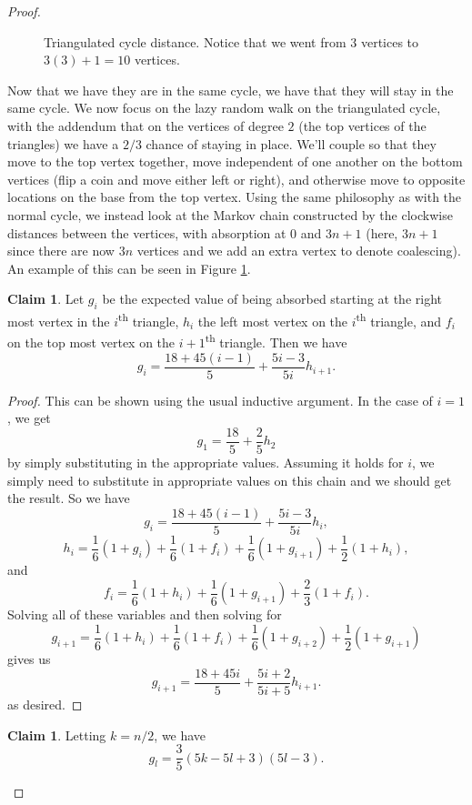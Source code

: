 \documentclass[10pt,a4paper]{amsart}
\theoremstyle{definition}
\numberwithin{definition}{section}
\newtheorem{claim}[definition]{Claim}
\begin{document}
\begin{proof}
\begin{figure}
    \caption{Triangulated cycle distance. Notice that we went from $3$ vertices to $3(3)+1 = 10$ vertices.}
    \label{fig:graph15}
\end{figure}

Now that we have they are in the same cycle, we have that they will stay in the same cycle. We now focus on the lazy random walk on the triangulated cycle, with the addendum that on the vertices of degree $2$ (the top vertices of the triangles) we have a $2/3$ chance of staying in place. We'll couple so that they move to the top vertex together, move independent of one another on the bottom vertices (flip a coin and move either left or right), and otherwise move to opposite locations on the base from the top vertex. Using the same philosophy as with the normal cycle, we instead look at the Markov chain constructed by the clockwise distances between the vertices, with absorption at $0$ and $3n+1$ (here, $3n+1$ since there are now $3n$ vertices and we add an extra vertex to denote coalescing). An example of this can be seen in Figure \ref{fig:graph15}. 
\begin{claim}
Let $g_i$ be the expected value of being absorbed starting at the right most vertex in the $i$\textsuperscript{th} triangle, $h_i$ the left most vertex on the $i$\textsuperscript{th} triangle, and $f_i$ on the top most vertex on the $i+1$\textsuperscript{th} triangle. Then we have
\[ g_i = \frac{18+45(i-1)}{5} + \frac{5i-3}{5i} h_{i+1}.\]
\end{claim}
\begin{proof}
This can be shown using the usual inductive argument. In the case of $i=1$, we get 
\[g_1 = \frac{18}{5} + \frac{2}{5}h_2 \]
by simply substituting in the appropriate values. Assuming it holds for $i$, we simply need to substitute in appropriate values on this chain and we should get the result. So we have 
\[g_i = \frac{18 + 45(i-1)}{5} + \frac{5i-3}{5i}h_i, \]
\[ h_i = \frac{1}{6}(1+ g_i) + \frac{1}{6}(1+f_i) + \frac{1}{6}(1+g_{i+1}) + \frac{1}{2}(1+h_i),\]
and
\[ f_i = \frac{1}{6}(1+h_i) + \frac{1}{6}(1+g_{i+1}) + \frac{2}{3}(1+f_i). \]
Solving all of these variables and then solving for
\[g_{i+1} = \frac{1}{6}(1+h_i) + \frac{1}{6}(1+f_i) + \frac{1}{6}(1+g_{i+2}) + \frac{1}{2}(1+g_{i+1}) \]
gives us 
\[g_{i+1} = \frac{18 + 45i}{5} + \frac{5i+2}{5i+5}h_{i+1}. \]
as desired. 
\end{proof}
\begin{claim}
Letting $k = n/2$, we have
\[g_l = \frac{3}{5}(5k-5l+3)(5l-3). \]
\end{claim}


\end{proof}
\end{document}

